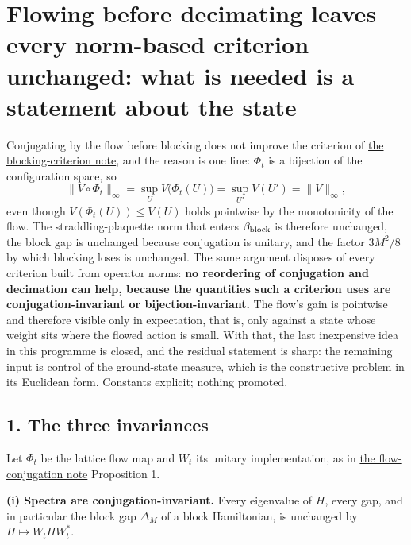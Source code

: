 \documentclass[11pt,a4paper]{article}
\begin{document}
\hypertarget{flowing-before-decimating-leaves-every-norm-based-criterion-unchanged-what-is-needed-is-a-statement-about-the-state}{%
\section{Flowing before decimating leaves every norm-based criterion
unchanged: what is needed is a statement about the
state}\label{flowing-before-decimating-leaves-every-norm-based-criterion-unchanged-what-is-needed-is-a-statement-about-the-state}}

Conjugating by the flow before blocking does not improve the criterion
of \href{blocking-criterion-monotone.md}{the blocking-criterion note},
and the reason is one line: \(\Phi_t\) is a bijection of the
configuration space, so
\[\big\|V\circ\Phi_t\big\|_\infty=\sup_U V\big(\Phi_t(U)\big)
=\sup_{U'}V(U')=\big\|V\big\|_\infty,\] even though
\(V(\Phi_t(U))\le V(U)\) holds pointwise by the monotonicity of the
flow. The straddling-plaquette norm that enters \(\beta_{\rm block}\) is
therefore unchanged, the block gap is unchanged because conjugation is
unitary, and the factor \(3M^2/8\) by which blocking loses is unchanged.
The same argument disposes of every criterion built from operator norms:
\textbf{no reordering of conjugation and decimation can help, because
the quantities such a criterion uses are conjugation-invariant or
bijection-invariant.} The flow's gain is pointwise and therefore visible
only in expectation, that is, only against a state whose weight sits
where the flowed action is small. With that, the last inexpensive idea
in this programme is closed, and the residual statement is sharp: the
remaining input is control of the ground-state measure, which is the
constructive problem in its Euclidean form. Constants explicit; nothing
promoted.

\hypertarget{the-three-invariances}{%
\subsection{1. The three invariances}\label{the-three-invariances}}

Let \(\Phi_t\) be the lattice flow map and \(W_t\) its unitary
implementation, as in \href{flow-conjugation-truncation.md}{the
flow-conjugation note} Proposition 1.

\textbf{(i) Spectra are conjugation-invariant.} Every eigenvalue of
\(H\), every gap, and in particular the block gap \(\Delta_M\) of a
block Hamiltonian, is unchanged by \(H\mapsto W_tHW_t^*\).
\end{document}
